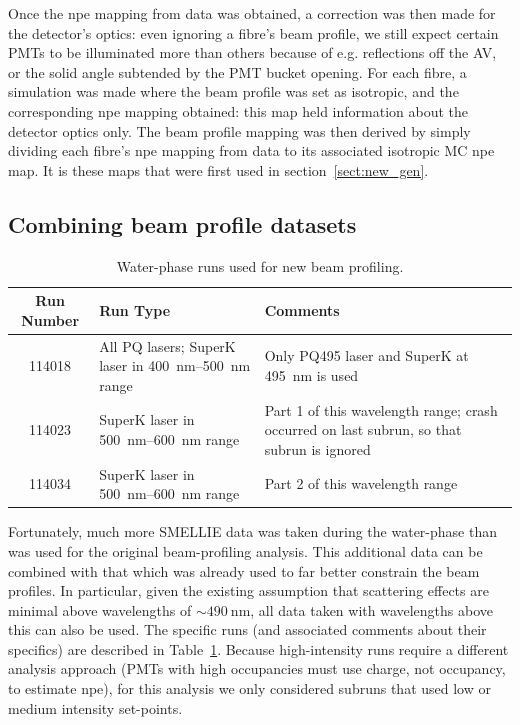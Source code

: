 Once the npe mapping from data was obtained, a correction was then made for the detector's optics: even ignoring a fibre's beam profile, we still expect certain PMTs to be illuminated more than others because of e.g. reflections off the AV, or the solid angle subtended by the PMT bucket opening. For each fibre, a simulation was made where the beam profile was set as isotropic, and the corresponding npe mapping obtained: this map held information about the detector optics only. The beam profile mapping was then derived by simply dividing each fibre's npe mapping from data to its associated isotropic MC npe map. It is these maps that were first used in section~\ref{sect:new_gen}.

\subsection{Combining beam profile datasets}
    \begin{table}
        \begin{tabular}{c p{6cm} p{6cm}}
            \hline
            Run Number & Run Type & Comments \\ \hline \hline
            \num{114018} & All PQ lasers; SuperK laser in \SIrange{400}{500}{\nano\metre} range & Only PQ495 laser and SuperK at \SI{495}{\nano\metre} is used \\
            \num{114023} & SuperK laser in \SIrange{500}{600}{\nano\metre} range & Part 1 of this wavelength range; crash occurred on last subrun, so that subrun is ignored \\
            \num{114034} & SuperK laser in \SIrange{500}{600}{\nano\metre} range & Part 2 of this wavelength range \\
            \hline
        \end{tabular}
        \caption{Water-phase runs used for new beam profiling.}
        \label{tab:runs_used}
    \end{table}
Fortunately, much more SMELLIE data was taken during the water-phase than was used for the original beam-profiling analysis. This additional data can be combined with that which was already used to far better constrain the beam profiles. In particular, given the existing assumption that scattering effects are minimal above wavelengths of $\sim\SI{490}{\nano\metre}$, all data taken with wavelengths above this can also be used. The specific runs (and associated comments about their specifics) are described in Table~\ref{tab:runs_used}. Because high-intensity runs require a different analysis approach (PMTs with high occupancies must use charge, not occupancy, to  estimate npe), for this analysis we only considered subruns that used low or medium intensity set-points.

